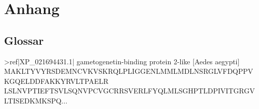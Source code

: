 \documentclass[a4paper]{article}
\newenvironment{fullgrayverb}
{\verbbox}
{\endverbbox\par\colorbox{lightgray}{\parbox{\textwidth}{\theverbbox}}\par}
\begin{document}
\newpage

\section{Anhang}
\subsection{Glossar}

\begin{fullgrayverb}
>ref|XP_021694431.1| gametogenetin-binding protein 2-like [Aedes aegypti]
MAKLTYVYRSDEMNCVKVSKRQLPLIGGENLMMLMDLNSRGLVFDQPPVKGQELDDFAKKYRVLTPAELR
LSLNVPTIEFTSVLSQNVPCVGCRRSVERLFYQLMLSGHPTLDPIVITGRGVLTISEDKMKSPQ...
\end{fullgrayverb}\\
\end{document}
